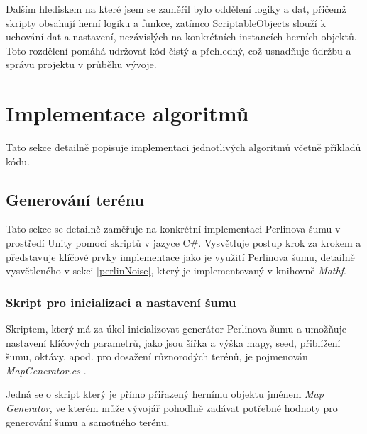 Dalším hlediskem na které jsem se zaměřil bylo oddělení logiky a dat, přičemž skripty obsahují herní logiku a funkce, zatímco ScriptableObjects slouží k uchování dat a nastavení, nezávislých na konkrétních instancích herních objektů. Toto rozdělení pomáhá udržovat kód čistý a přehledný, což usnadňuje údržbu a správu projektu v průběhu vývoje.

\section{Implementace algoritmů}
Tato sekce detailně popisuje implementaci jednotlivých algoritmů včetně příkladů kódu.

\subsection{Generování terénu}
Tato sekce se detailně zaměřuje na konkrétní implementaci Perlinova šumu v prostředí Unity pomocí skriptů v jazyce C\#. Vysvětluje postup krok za krokem a představuje klíčové prvky implementace jako je využití Perlinova šumu, detailně vysvětleného v sekci \ref{perlinNoise}, který je implementovaný v knihovně \textit{Mathf}. 

\subsubsection{Skript pro inicializaci a nastavení šumu}
Skriptem, který má za úkol inicializovat generátor Perlinova šumu a umožňuje nastavení klíčových parametrů, jako jsou šířka a výška mapy, seed, přiblížení šumu, oktávy, apod. pro dosažení různorodých terénů, je pojmenován \textit{MapGenerator.cs} . 

Jedná se o skript který je přímo přiřazený hernímu objektu jménem \textit{Map Generator}, ve kterém může vývojář pohodlně zadávat potřebné hodnoty pro generování šumu a samotného terénu.

